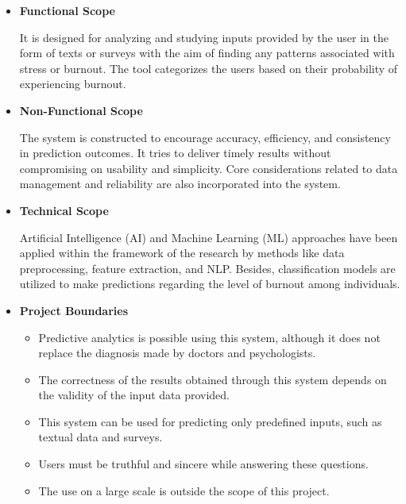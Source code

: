 \begin{itemize}

\item \textbf{Functional Scope}

It is designed for analyzing and studying inputs provided by the user in the form of texts or surveys with the aim of finding any patterns associated with stress or burnout. The tool categorizes the users based on their probability of experiencing burnout.

\item \textbf{Non-Functional Scope}

The system is constructed to encourage accuracy, efficiency, and consistency in prediction outcomes. It tries to deliver timely results without compromising on usability and simplicity. Core considerations related to data management and reliability are also incorporated into the system.

\item \textbf{Technical Scope}

Artificial Intelligence (AI) and Machine Learning (ML) approaches have been applied within the framework of the research by methods like data preprocessing, feature extraction, and NLP. Besides, classification models are utilized to make predictions regarding the level of burnout among individuals.

\item \textbf{Project Boundaries}

\begin{itemize}
    \item Predictive analytics is possible using this system, although it does not replace the diagnosis made by doctors and psychologists.
    \item The correctness of the results obtained through this system depends on the validity of the input data provided.
    \item This system can be used for predicting only predefined inputs, such as textual data and surveys. 
    \item Users must be truthful and sincere while answering these questions.
    \item The use on a large scale is outside the scope of this project.
\end{itemize}

\end{itemize}

